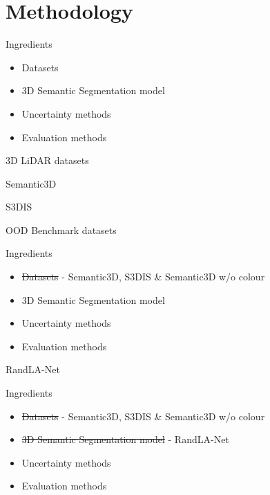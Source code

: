 \documentclass[aspectratio=169]{beamer}
\begin{document}
\section{Methodology}
\begin{frame}{Ingredients}
    \begin{itemize}
        \item Datasets
        \item 3D Semantic Segmentation model
        \item Uncertainty methods
        \item Evaluation methods
    \end{itemize}
\end{frame}
\begin{frame}{3D LiDAR datasets}
    
\end{frame}
\begin{frame}{Semantic3D}
    
\end{frame}
\begin{frame}{S3DIS}
    
\end{frame}
\begin{frame}{OOD Benchmark datasets}
    
\end{frame}
\begin{frame}{Ingredients}
    \begin{itemize}
        \item \st{Datasets} - Semantic3D, S3DIS \& Semantic3D w/o colour
        \item 3D Semantic Segmentation model
        \item Uncertainty methods
        \item Evaluation methods
    \end{itemize}
\end{frame}
\begin{frame}{RandLA-Net}
    
\end{frame}
\begin{frame}{Ingredients}
    \begin{itemize}
        \item \st{Datasets} - Semantic3D, S3DIS \& Semantic3D w/o colour
        \item \st{3D Semantic Segmentation model} - RandLA-Net
        \item Uncertainty methods
        \item Evaluation methods
    \end{itemize}
\end{frame}
\end{document}
